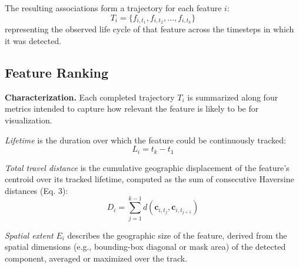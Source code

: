 \documentclass[journal abbreviation, manuscript]{copernicus}
\begin{document}
The resulting associations form a trajectory for each feature $i$:
\begin{equation}
T_i = \{f_{i,t_1}, f_{i,t_2}, \dots, f_{i,t_k}\}
\tag{4}
\end{equation}
representing the observed life cycle of that feature across the timesteps in which it was detected.


\subsection{Feature Ranking}

\textbf{Characterization.} Each completed trajectory $T_i$ is summarized along four metrics intended to capture how relevant the feature is likely to be for visualization.

\textit{Lifetime} is the duration over which the feature could be continuously tracked:
\begin{equation}
L_i = t_k - t_1
\tag{5}
\end{equation}

\textit{Total travel distance} is the cumulative geographic displacement of the feature's centroid over its tracked lifetime, computed as the sum of consecutive Haversine distances (Eq. 3):
\begin{equation}
D_i =
\sum_{j=1}^{k-1}
d\!\left(
\mathbf{c}_{i,t_j},
\mathbf{c}_{i,t_{j+1}}
\right)
\tag{6}
\end{equation}

\textit{Spatial extent} $E_i$ describes the geographic size of the feature, derived from the spatial dimensions (e.g., bounding-box diagonal or mask area) of the detected component, averaged or maximized over the track.
\end{document}
